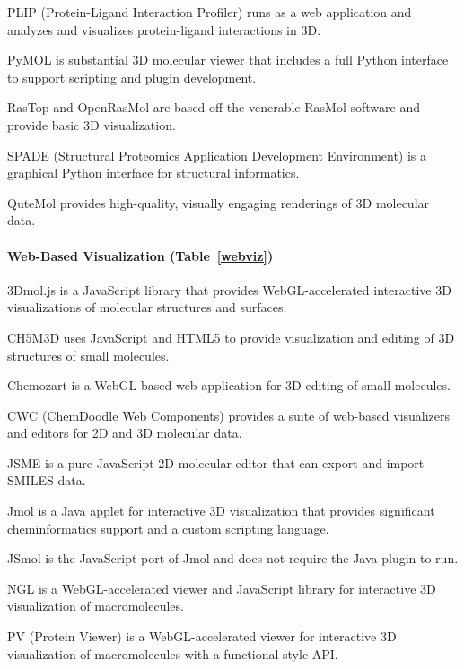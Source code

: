 PLIP (Protein-Ligand Interaction Profiler) \cite{Salentin_2015} runs as a web application and analyzes and visualizes protein-ligand interactions in 3D.

PyMOL is substantial 3D molecular viewer that includes a full Python interface to support scripting and plugin development.

RasTop and OpenRasMol are based off the venerable RasMol software and provide basic 3D visualization. 

SPADE (Structural Proteomics Application Development Environment) \cite{sweeney2011computational} is a graphical Python interface for structural informatics.

QuteMol \cite{Tarini_2006} provides high-quality, visually engaging renderings of 3D molecular data.


\paragraph{Web-Based Visualization (Table~\ref{webviz})}

3Dmol.js \cite{Rego_2014} is a JavaScript library that provides WebGL-accelerated interactive 3D visualizations of molecular structures and surfaces.

CH5M3D \cite{Earley_2013} uses JavaScript and HTML5 to provide visualization and editing of 3D structures of small molecules.

Chemozart \cite{Mohebifar_2015} is a WebGL-based web application for 3D editing of small molecules.

CWC (ChemDoodle Web Components) \cite{Burger_2015} provides a suite of web-based visualizers and editors for 2D and 3D molecular data.

JSME \cite{Bienfait_2013} is a pure JavaScript 2D molecular editor that can export and import SMILES data.

Jmol \cite{Hanson_2010} is a Java applet for interactive 3D visualization that provides significant cheminformatics support and a custom scripting language.

JSmol \cite{Hanson_2013} is the JavaScript port of Jmol and does not require the Java plugin to run.

NGL \cite{Rose_2015} is a WebGL-accelerated viewer and JavaScript library for interactive 3D visualization of macromolecules.

PV (Protein Viewer) \cite{95f13b46-4e83-4cdd-afc0-6de07bca5ae8} is a WebGL-accelerated viewer for interactive 3D visualization of macromolecules with a functional-style API.





